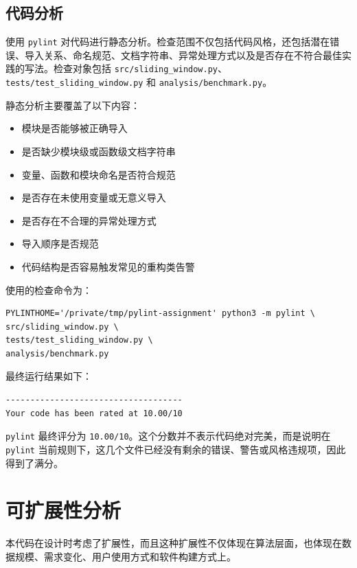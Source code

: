 \documentclass[a4paper,UTF8,fontset=none]{ctexart}
\begin{document}
\subsection{代码分析}

使用 \texttt{pylint} 对代码进行静态分析。检查范围不仅包括代码风格，还包括潜在错误、导入关系、命名规范、文档字符串、异常处理方式以及是否存在不符合最佳实践的写法。检查对象包括 \texttt{src/sliding\_window.py}、\texttt{tests/test\_sliding\_window.py} 和 \texttt{analysis/benchmark.py}。

静态分析主要覆盖了以下内容：

\begin{itemize}
    \item 模块是否能够被正确导入
    \item 是否缺少模块级或函数级文档字符串
    \item 变量、函数和模块命名是否符合规范
    \item 是否存在未使用变量或无意义导入
    \item 是否存在不合理的异常处理方式
    \item 导入顺序是否规范
    \item 代码结构是否容易触发常见的重构类告警
\end{itemize}

使用的检查命令为：

\begin{lstlisting}[title=pylint 检查命令]
PYLINTHOME='/private/tmp/pylint-assignment' python3 -m pylint \
src/sliding_window.py \
tests/test_sliding_window.py \
analysis/benchmark.py
\end{lstlisting}

最终运行结果如下：

\begin{lstlisting}[title=pylint 输出结果]
------------------------------------
Your code has been rated at 10.00/10
\end{lstlisting}

\texttt{pylint} 最终评分为 \texttt{10.00/10}。这个分数并不表示代码绝对完美，而是说明在 \texttt{pylint} 当前规则下，这几个文件已经没有剩余的错误、警告或风格违规项，因此得到了满分。

\section{可扩展性分析}

本代码在设计时考虑了扩展性，而且这种扩展性不仅体现在算法层面，也体现在数据规模、需求变化、用户使用方式和软件构建方式上。
\end{document}
